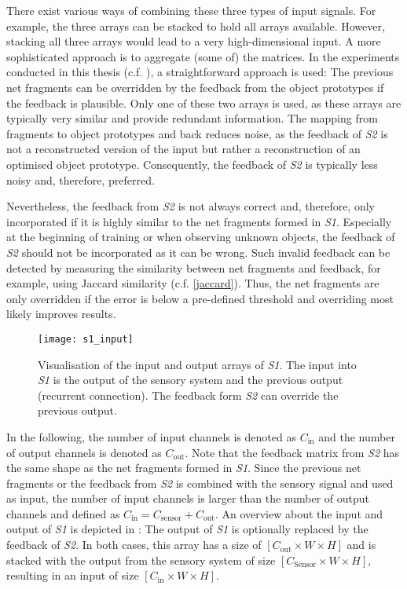 There exist various ways of combining these three types of input signals. For example, the three arrays can be stacked to hold all arrays available.
However, stacking all three arrays would lead to a very high-dimensional input.
A more sophisticated approach is to aggregate (some of) the matrices.
In the experiments conducted in this thesis (c.f. ), a straightforward approach is used: The previous net fragments can be overridden by the feedback from the object prototypes if the feedback is plausible.
Only one of these two arrays is used, as these arrays are typically very similar and provide redundant information. The mapping from fragments to object prototypes and back reduces noise, as the feedback of \emph{S2} is not a reconstructed version of the input but rather a reconstruction of an optimised object prototype. Consequently, the feedback of \emph{S2} is typically less noisy and, therefore, preferred.

Nevertheless, the feedback from \emph{S2} is not always correct and, therefore, only incorporated if it is highly similar to the net fragments formed in \emph{S1}. Especially at the beginning of training or when observing unknown objects, the feedback of \emph{S2} should not be incorporated as it can be wrong.
Such invalid feedback can be detected by measuring the similarity between net fragments and feedback, for example, using Jaccard similarity (c.f. \eqref{jaccard}). Thus, the net fragments are only overridden if the error is below a pre-defined threshold and overriding most likely improves results.

\begin{figure}[h]
    \centering
    \texttt{[image: s1\_input]}
    \caption[Input and output of \emph{S1}]{Visualisation of the input and output arrays of \emph{S1}. The input into \emph{S1} is the output of the sensory system and the previous output (recurrent connection). The feedback form \emph{S2} can override the previous output.}
\end{figure}


In the following, the number of input channels is denoted as $C_{\text{in}}$ and the number of output channels is denoted as $C_{\text{out}}$.
Note that the feedback matrix from \emph{S2} has the same shape as the net fragments formed in \emph{S1}.
Since the previous net fragments or the feedback from \emph{S2} is combined with the sensory signal and used as input, the number of input channels is larger than the number of output channels and defined as $C_{\text{in}} = C_{\text{sensor}} + C_{\text{out}}$.
An overview about the input and output of \emph{S1} is depicted in :
The output of \emph{S1} is optionally replaced by the feedback of \emph{S2}. In both cases, this array has a size of $[C_{\text{out}} \times W \times H]$ and is stacked with the output from the sensory system of size $[C_{\text{Sensor}} \times W \times H]$, resulting in an input of size $[C_{\text{in}} \times W \times H]$.


